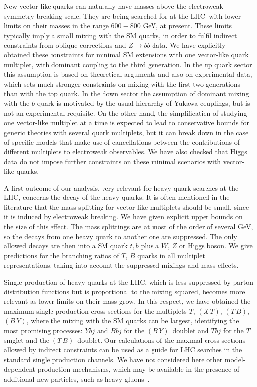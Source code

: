 \documentclass[12pt,a4paper]{article}
\newcommand{\xt}{$(X\,T)$}
\newcommand{\tb}{$(T\,B)$}
\newcommand{\by}{$(B\,Y)$}
\begin{document}
New vector-like quarks can naturally have masses above the electroweak symmetry breaking scale. They are being searched for at the LHC, with lower limits on their masses in the range $600-800$ GeV, at present. These limits typically imply a small mixing with the SM quarks, in order to fulfil indirect constraints from oblique corrections and $Z \to b \bar b$ data. We have explicitly obtained these constraints for minimal SM extensions with one vector-like quark multiplet, with dominant coupling to the third generation. In the up quark sector this assumption is based on theoretical arguments and also on experimental data, which sets much stronger constraints on mixing with the first two generations than with the top quark. In the down sector the assumption of dominant mixing with the $b$ quark is motivated by the usual hierarchy of Yukawa couplings, but is not an experimental requisite. On the other hand, the simplification of studying one vector-like multiplet at a time is expected to lead to conservative bounds for generic theories with several quark multiplets, but it can break down in the case of specific models that make use of cancellations between the contributions of different multiplets to electroweak observables. We have also checked that Higgs data do not impose further constraints on these minimal scenarios with vector-like quarks.

A first outcome of our analysis, very relevant for heavy quark searches at the LHC, concerns the decay of the heavy quarks.
It is often mentioned in the literature that the mass splitting for vector-like multiplets should be small, since it is induced by electroweak breaking. We have given explicit upper bounds on the size of this effect. The mass splittings are at most of the order of several GeV, so the decays from one heavy quark to another one are suppressed. The only allowed decays are then into a SM quark $t,b$ plus a $W$, $Z$ or Higgs boson. We give predictions for the branching ratios of $T$, $B$ quarks in all multiplet representations, taking into account the suppressed mixings and mass effects.

Single production of heavy quarks at the LHC, which is less suppressed by parton distribution functions but is proportional to the mixing squared, becomes more relevant as lower limits on their mass grow. In this respect, we have obtained the maximum single production cross sections for the multiplets $T$, \xt, \tb, \by, where the mixing with the SM quarks can be largest, identifying the most promising processes: $Y \bar b j$ and $B \bar b j$ for the \by\ doublet and $T \bar b j$ for the $T$ singlet and the \tb\ doublet. Our calculations of the maximal cross sections allowed by indirect constraints can be used as a guide for LHC searches in the standard single production channels. We have not considered here other model-dependent production mechanisms, which may be available in the presence of additional new particles, such as heavy gluons~\cite{Dobrescu:2009vz,Vignaroli:2011ik,Barcelo:2011wu,Chala:2013ega,Redi:2013eaa}.
\end{document}
